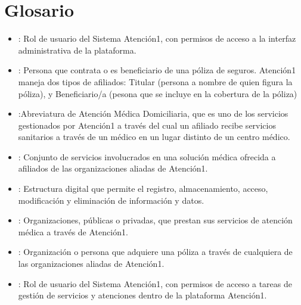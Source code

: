 \documentclass[letterpaper,10pt,spanish]{sphinxmanual}
\begin{document}
\chapter{Glosario}
\label{\detokenize{05glosario:glosario}}\label{\detokenize{05glosario:id1}}\label{\detokenize{05glosario::doc}}\begin{itemize}
\item {} 
: Rol de usuario del Sistema Atención\sphinxhyphen{}1, con permisos de acceso a la interfaz administrativa de la plataforma.

\item {} 
: Persona que contrata o es beneficiario de una póliza de seguros. Atención\sphinxhyphen{}1 maneja dos tipos de afiliados: Titular (persona a nombre de quien figura la póliza), y Beneficiario/a (pesona que se incluye en la cobertura de la póliza)

\item {} 
:Abreviatura de Atención Médica Domiciliaria, que es uno de los servicios gestionados por Atención\sphinxhyphen{}1 a través del cual un afiliado recibe servicios sanitarios a través de un médico en un lugar distinto de un centro médico.

\item {} 
: Conjunto de servicios involucrados en una solución médica ofrecida a afiliados de las organizaciones aliadas de Atención\sphinxhyphen{}1.

\item {} 
: Estructura digital que permite el registro, almacenamiento, acceso, modificación y eliminación de información y datos.

\item {} 
: Organizaciones, públicas o privadas, que prestan sus servicios de atención médica a través de Atención\sphinxhyphen{}1.

\item {} 
: Organización o persona que adquiere una póliza a través de cualquiera de las organizaciones aliadas de Atención\sphinxhyphen{}1.

\item {} 
: Rol de usuario del Sistema Atención\sphinxhyphen{}1, con permisos de acceso a tareas de gestión de servicios y atenciones dentro de la plataforma Atención\sphinxhyphen{}1.


\end{itemize}
\end{document}
